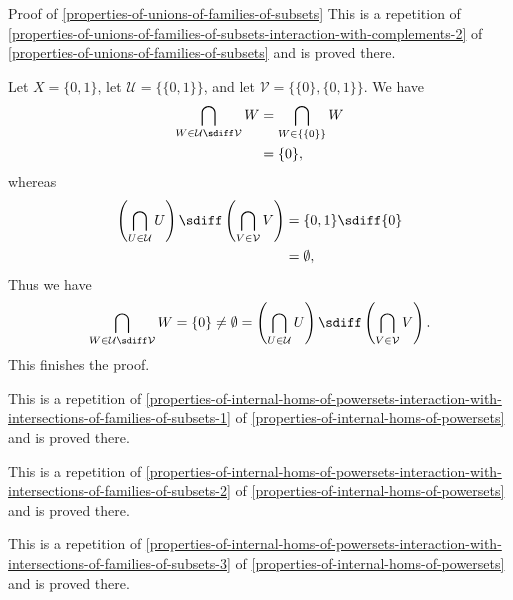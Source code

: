 \begin{Proof}{Proof of \cref{properties-of-unions-of-families-of-subsets}}
    This is a repetition of \cref{properties-of-unions-of-families-of-subsets-interaction-with-complements-2} of \cref{properties-of-unions-of-families-of-subsets} and is proved there.

    Let $X=\{0,1\}$, let $\mathcal{U}=\{\{0,1\}\}$, and let $\mathcal{V}=\{\{0\},\{0,1\}\}$. We have
    \begin{align*}
        \bigcap_{W\in\mathcal{U}\sdiff\mathcal{V}}W &= \bigcap_{W\in\{\{0\}\}}W\\
                                                    &= \{0\},
    \end{align*}
    whereas
    \begin{align*}
        \left(\bigcap_{U\in\mathcal{U}}U\right)\sdiff\left(\bigcap_{V\in\mathcal{V}}V\right) &= \{0,1\}\sdiff\{0\}\\
                                                                       &= \emptyset,
    \end{align*}
    Thus we have
    \[
        \bigcap_{W\in\mathcal{U}\sdiff\mathcal{V}}W%
        =%
        \{0\}%
        \neq%
        \emptyset%
        =%
        \left(\bigcap_{U\in\mathcal{U}}U\right)\sdiff\left(\bigcap_{V\in\mathcal{V}}V\right).%
    \]%
    This finishes the proof.

    This is a repetition of \cref{properties-of-internal-homs-of-powersets-interaction-with-intersections-of-families-of-subsets-1} of \cref{properties-of-internal-homs-of-powersets} and is proved there.

    This is a repetition of \cref{properties-of-internal-homs-of-powersets-interaction-with-intersections-of-families-of-subsets-2} of \cref{properties-of-internal-homs-of-powersets} and is proved there.

    This is a repetition of \cref{properties-of-internal-homs-of-powersets-interaction-with-intersections-of-families-of-subsets-3} of \cref{properties-of-internal-homs-of-powersets} and is proved there.


\end{Proof}
